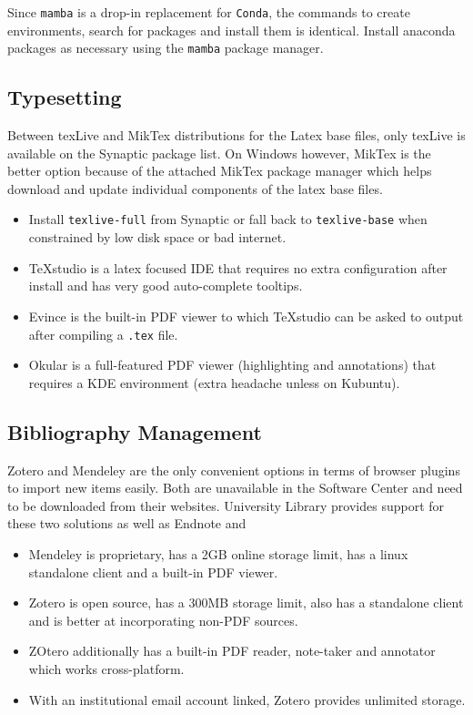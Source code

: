 \documentclass[8pt,letterpaper,twocolumn]{article}
\begin{document}
Since \texttt{mamba} is a drop-in replacement for \texttt{Conda}, the commands to create environments, search for
packages and install them is identical. Install anaconda packages as necessary using the \texttt{mamba} package manager.





\subsection{Typesetting}

Between texLive and MikTex distributions for the Latex base files, only texLive is available on the Synaptic package list. On Windows however, MikTex is the better option because of the attached MikTex package manager which helps download and update individual components of the latex base files.

\begin{itemize}
	\item Install \texttt{texlive-full} from Synaptic or fall back to \texttt{texlive-base} when constrained by low disk space or bad internet.
	\item TeXstudio is a latex focused IDE that requires no extra configuration after install and has very good auto-complete tooltips.
	\item Evince is the built-in PDF viewer to which TeXstudio can be asked to output after compiling a \texttt{.tex} file.
	\item Okular is a full-featured PDF viewer (highlighting and annotations) that requires a KDE environment (extra headache unless on Kubuntu).
\end{itemize}


\subsection{Bibliography Management}

Zotero and Mendeley are the only convenient options in terms of browser plugins to import new items easily. Both are unavailable in the Software Center and need to be downloaded from their websites. University Library provides support for these two solutions as well as Endnote and

\begin{itemize}
	\item Mendeley is proprietary, has a 2GB online storage limit, has a linux standalone client and a built-in PDF viewer.
	\item Zotero is open source, has a 300MB storage limit, also has a standalone client and is better at incorporating non-PDF sources.
	\item ZOtero additionally has a built-in PDF reader, note-taker and annotator which works cross-platform.
	\item With an institutional email account linked, Zotero provides unlimited storage.
\end{itemize}
\end{document}
